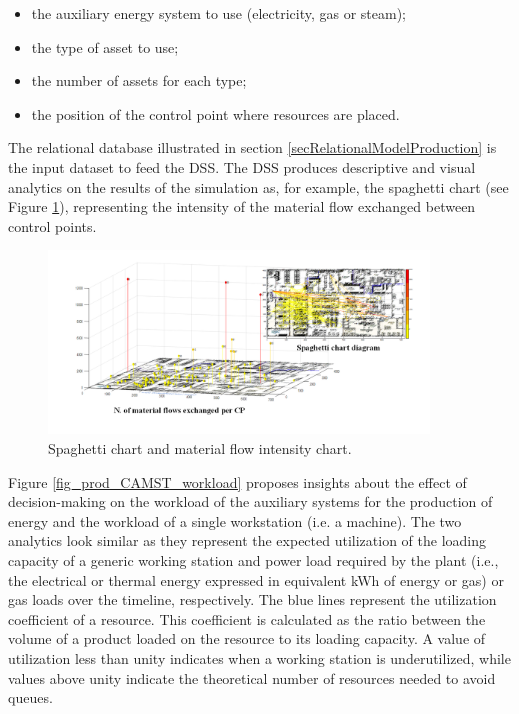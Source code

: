 \begin{itemize}
    \item the auxiliary energy system to use (electricity, gas or steam);
    \item the type of asset to use;
    \item the number of assets for each type;
    \item the position of the control point where resources are placed.

\end{itemize}

The relational database illustrated in section \ref{secRelationalModelProduction} is the input dataset to feed the DSS. The DSS produces descriptive and visual analytics on the results of the simulation as, for example, the spaghetti chart (see Figure \ref{fig_prod_CAMST_spaghettiChart}), representing the intensity of the material flow exchanged between control points.

\begin{figure}[hbt!]
\centering
\includegraphics[width=0.9\textwidth]{sectionProduction/design_plant_figures/fig_prod_CAMST_spaghettiChart.png}
\captionsetup{type=figure}
\caption{Spaghetti chart and material flow intensity chart.}
\label{fig_prod_CAMST_spaghettiChart}
\end{figure}

Figure \ref{fig_prod_CAMST_workload} proposes insights about the effect of decision-making on the workload of the auxiliary systems for the production of energy and the workload of a single workstation (i.e. a machine). The two analytics look similar as they represent the expected utilization of the loading capacity of a generic working station and power load required by the plant (i.e., the electrical or thermal energy expressed in equivalent kWh of energy or gas) or gas loads over the timeline, respectively. The blue lines represent the utilization coefficient of a resource. This coefficient is calculated as the ratio between the volume of a product loaded on the resource to its loading capacity. A value of utilization less than unity indicates when a working station is underutilized, while values above unity indicate the theoretical number of resources needed to avoid queues.\par

